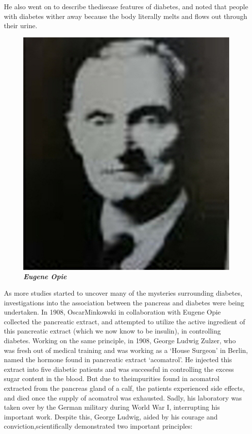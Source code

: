 He also went on to describe the\break disease features of diabetes, and noted that people with diabetes wither away because the body literally melts and flows out through their urine.

\begin{figure}
\centering
\includegraphics[scale=.7]{images/010.jpg}\\
\textbf{\textit{Eugene Opie}}
\end{figure}

As more studies started to un\-cover many of the mysteries surrounding dia\-betes, investigations into the association between the pancreas and diabetes were being undertaken. In 1908, Oscar\break Minkowski in collaboration with Eugene Opie collected the pancreatic extract, and attempted to utilize the active ingredient of this pancreatic extract (which we now know to be insulin), in controlling diabetes. Working on the same principle, in 1908, George Ludwig Zulzer, who was fresh out of medical training and was working as a ‘House Surgeon’ in Berlin, named the hormone found in pancreatic extract ‘acomatrol’. He inje\-cted this extract into five diabetic patients and was successful in controlling the excess sugar content in the blood. But due to the\break impurities found in acomatrol extracted from the pancreas gland of a calf, the patients experienced side effects, and died once the supply of acomatrol was exhausted. Sadly, his laboratory was taken over by the German military during World War I, interrupting his important work. Despite this, George Ludwig, aided by his courage and conviction,\break scientifically demonstrated two important principles:

